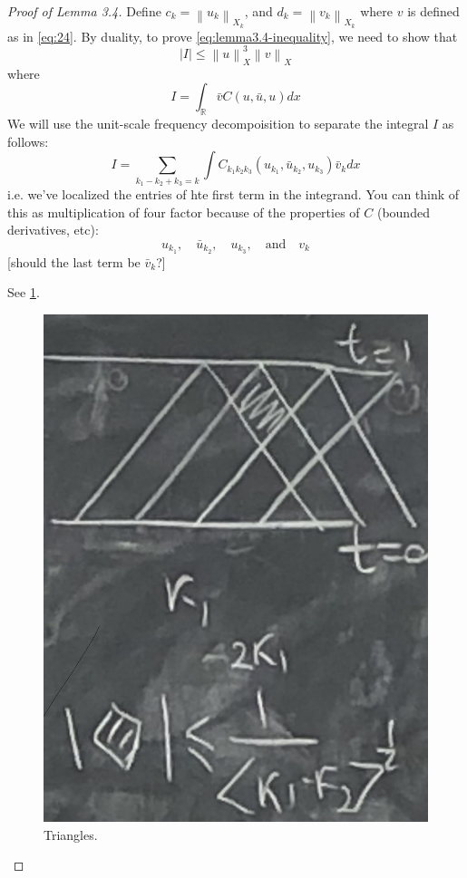 \documentclass{article}
\def\purple{\color{Purple}}
\newcommand{\pnote}[1]{{\purple [#1]}} %
\newcommand\norm[1]{\left\lVert#1\right\rVert}
\begin{document}
\begin{proof}[Proof of Lemma 3.4]
  Define $c_{k}= \norm{u_{k}}_{X_{k}}$, and $d_{k}=\norm{v_{k}}_{X_{k}}$  where
  $v$ is defined as in \cref{eq:24}. By duality, to prove
  \cref{eq:lemma3.4-inequality}, we need to show that
  \begin{equation*}
    \left| I \right| \leq  \norm{u}_{X}^{3}\norm{v}_{X}
  \end{equation*}
  where
  \begin{equation*}
    I = \int_{\mathbb{R}} \bar{v}C(u,\bar{u},u)dx
  \end{equation*}
  We will use the unit-scale frequency decompoisition to separate the integral
  $I$ as follows:
  \begin{equation*}
    I = \sum_{k_{1}-k_{2}+k_{3}=k}
    \int C_{k_{1}k_{2}k_{3}}(u_{k_{1}},\bar{u}_{k_{2}},u_{k_{3}})
    \bar{v}_{k} dx
  \end{equation*}
  i.e. we've localized the entries of hte first term in the integrand. You can
  think of this as multiplication of four factor because of the properties of
  $C$ (bounded derivatives, etc):
  \begin{equation*}
    u_{k_{1}},\quad \bar{u}_{k_{2}},\quad u_{k_{3}}, \quad \text{and} \quad v_{k}
  \end{equation*}
  \pnote{should the last term be $\bar{v}_{k} $?}

  See \ref{fig:triangles}.

  \begin{figure}[h]
    \centering
    \includegraphics[scale=.2]{triangles}
    \caption{Triangles.}
    \label{fig:triangles}
  \end{figure}



\end{proof}
\end{document}
